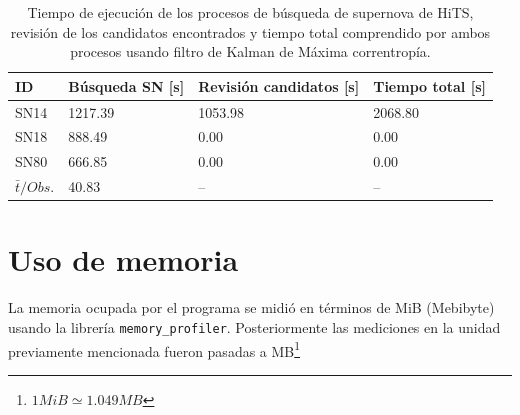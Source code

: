 \begin{table}[h!]
\centering
\begin{tabular}{|l|l|l|l|}
\hline
\textbf{ID} & \textbf{B\'usqueda SN [s]} & \textbf{Revisi\'on candidatos [s]} & \textbf{Tiempo total [s]} \\ \hline
\hline
SN14 & 1217.39 & 1053.98 & 2068.80\\\hline
SN18 & 888.49 & 0.00 & 0.00\\\hline
SN80 & 666.85 & 0.00& 0.00\\\hline \hline
 $\bar{t}/Obs. $& 40.83 & -- & --\\\hline 
\end{tabular}
\label{tab:t6}
\caption{Tiempo de ejecuci\'on de los procesos de b\'usqueda de supernova de HiTS, revisi\'on de los candidatos encontrados y tiempo total comprendido por ambos procesos usando filtro de Kalman de M\'axima correntrop\'ia.}
\end{table}

\section{Uso de memoria}

La memoria ocupada por el programa se midi\'o en t\'erminos de MiB (Mebibyte) usando la librer\'ia \texttt{memory\_profiler}. Posteriormente las mediciones en la unidad previamente mencionada fueron pasadas a MB\footnote{$1MiB\simeq 1.049MB$ }

